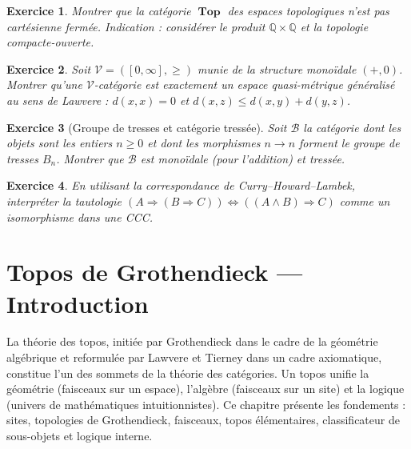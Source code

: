 \documentclass[a4paper,12pt]{book}
\DeclareMathOperator{\Top}{\mathbf{Top}}
\newcommand{\Q}{\mathbb{Q}}
\newtheorem{exercice}{Exercice}[chapter]
\begin{document}
\begin{exercice}\label{exo:ccc-pas-Set}
Montrer que la catégorie $\Top$ des espaces topologiques n'est
\emph{pas} cartésienne fermée.
\textit{Indication} : considérer le produit $\Q \times \Q$ et la
topologie compacte-ouverte.
\index{Top@$\Top$!pas cartésienne fermée}
\end{exercice}

\begin{exercice}\label{exo:enrichie-metrique}
Soit $\mathcal{V} = ([0, \infty], \geq)$ munie de la structure
monoïdale $(+, 0)$.  Montrer qu'une $\mathcal{V}$-catégorie est
exactement un espace quasi-métrique généralisé au sens de Lawvere :
$d(x,x) = 0$ et $d(x,z) \leq d(x,y) + d(y,z)$.
\end{exercice}

\begin{exercice}[Groupe de tresses et catégorie tressée]
\label{exo:tresses}
Soit $\mathcal{B}$ la catégorie dont les objets sont les entiers
$n \geq 0$ et dont les morphismes $n \to n$ forment le groupe de
tresses $B_n$.  Montrer que $\mathcal{B}$ est monoïdale (pour
l'addition) et tressée.
\end{exercice}

\begin{exercice}\label{exo:curry-logique}
En utilisant la correspondance de Curry--Howard--Lambek, interpréter
la tautologie $(A \Rightarrow (B \Rightarrow C)) \Leftrightarrow
((A \wedge B) \Rightarrow C)$ comme un isomorphisme dans une CCC.
\end{exercice}




\chapter{Topos de Grothendieck --- Introduction}\label{ch:topos}
\minitoc

\vspace{1em}

La théorie des topos, initiée par Grothendieck dans le cadre de la
géométrie algébrique et reformulée par Lawvere et Tierney dans un cadre
axiomatique, constitue l'un des sommets de la théorie des catégories.
Un topos unifie la géométrie (faisceaux sur un espace),
l'algèbre (faisceaux sur un site) et la logique (univers de
mathématiques intuitionnistes).  Ce chapitre présente les fondements :
sites, topologies de Grothendieck, faisceaux, topos élémentaires,
classificateur de sous-objets et logique interne.
\end{document}
